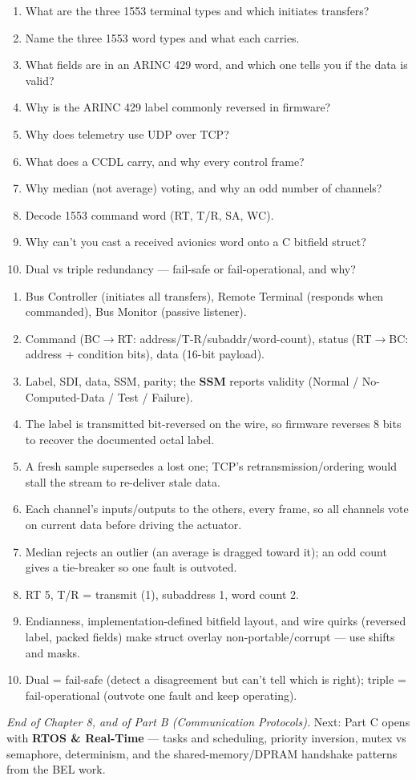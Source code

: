 \begin{scorecard}
\begin{enumerate}
\item What are the three 1553 terminal types and which initiates transfers?
\item Name the three 1553 word types and what each carries.
\item What fields are in an ARINC 429 word, and which one tells you if the data
  is valid?
\item Why is the ARINC 429 label commonly reversed in firmware?
\item Why does telemetry use UDP over TCP?
\item What does a CCDL carry, and why every control frame?
\item Why median (not average) voting, and why an odd number of channels?
\item Decode 1553 command word  (RT, T/R, SA, WC).
\item Why can't you cast a received avionics word onto a C bitfield struct?
\item Dual vs triple redundancy --- fail-safe or fail-operational, and why?
\end{enumerate}
\end{scorecard}

\begin{answerkey}
\begin{enumerate}
\item Bus Controller (initiates all transfers), Remote Terminal (responds when
  commanded), Bus Monitor (passive listener).
\item Command (BC$\rightarrow$RT: address/T-R/subaddr/word-count), status
  (RT$\rightarrow$BC: address + condition bits), data (16-bit payload).
\item Label, SDI, data, SSM, parity; the \textbf{SSM} reports validity (Normal /
  No-Computed-Data / Test / Failure).
\item The label is transmitted bit-reversed on the wire, so firmware reverses 8
  bits to recover the documented octal label.
\item A fresh sample supersedes a lost one; TCP's retransmission/ordering would
  stall the stream to re-deliver stale data.
\item Each channel's inputs/outputs to the others, every frame, so all channels
  vote on current data before driving the actuator.
\item Median rejects an outlier (an average is dragged toward it); an odd count
  gives a tie-breaker so one fault is outvoted.
\item RT 5, T/R = transmit (1), subaddress 1, word count 2.
\item Endianness, implementation-defined bitfield layout, and wire quirks
  (reversed label, packed fields) make struct overlay non-portable/corrupt ---
  use shifts and masks.
\item Dual = fail-safe (detect a disagreement but can't tell which is right);
  triple = fail-operational (outvote one fault and keep operating).
\end{enumerate}
\end{answerkey}

\begin{partnote}
\emph{End of Chapter 8, and of Part B (Communication Protocols).} Next: Part C
opens with \textbf{RTOS \& Real-Time} --- tasks and scheduling, priority
inversion, mutex vs semaphore, determinism, and the shared-memory/DPRAM handshake
patterns from the BEL work.
\end{partnote}
